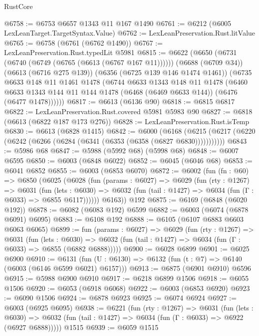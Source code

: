 \begin{lexlean}{RustCore}
\begin{coremodule}
@6758 := @6753 @6657 @1343 @11 @167 @1490
@6761 := @6212 (@6005 LexLeanTarget.TargetSyntax.Value)
@6762 := LexLeanPreservation.Rust.litValue
@6765 := @6758 (@6761 (@6762 @1490))
@6767 := LexLeanPreservation.Rust.typedLit @5981
@6815 := @6622
    (@6650
      (@6731 (@6740 (@6749 (@6765 (@6613 (@6767 @167 @11))))))
      (@6688 (@6709 @34))
      (@6613 (@6716 @275 @139))
      (@6356 (@6725 @139 @146 @1474 @1461))
      (@6735
        @6633
        @148
        @11
        @1461
        @1478
        (@6744
          @6633
          @1343
          @148
          @11
          @1478
          (@6460
            @6633
            @1343
            @144
            @11
            @144
            @1478
            (@6468 (@6469 @6633 @144))
            (@6476 (@6477 @1478))))))
@6817 := @6613 (@6136 @90)
@6818 := @6815 @6817
@6822 := LexLeanPreservation.Rust.covered @5981 @5983 @90
@6827 := @6818 (@6613 (@6822 @187 @173 @276))
@6828 := LexLeanPreservation.Rust.isTemp
@6830 := @6613 (@6828 @1415)
@6842 := @6000
    (@6168 (@6215 (@6217 (@6220 (@6242 (@6266 (@6284 (@6341 (@6353 (@6358 (@6827 @6830)))))))))))
@6843 := @5986 @68
@6847 := @5988 (@5992 @68) (@5998 @68)
@6848 := @6007 @6595
@6850 := @6003 (@6848 @6022)
@6852 := @6045 (@6046 @68)
@6853 := @6041 @6852
@6855 := @6003 (@6853 @6070)
@6872 := @6002
    (fun (fn : @60) =>
    @6850
      (@6025
        (@6028
          (fun (params : @6027) =>
          @6029
            (fun (rty : @1267) =>
            @6031
              (fun (lets : @6030) =>
              @6032 (fun (tail : @1427) => @6034 (fun (Γ : @6033) => @6855 @6117))))))
        @6163))
    @192
@6875 := @6169 (@6848 (@6020 @192))
@6878 := @6082 (@6083 @192) @6599
@6882 := @6003 (@6074 (@6878 @6091) @6095)
@6883 := @6108 @192
@6888 := @6105 (@6107 @6883 @6603 @6063 @6065)
@6899 := fun (params : @6027) =>
  @6029
    (fun (rty : @1267) =>
    @6031
      (fun (lets : @6030) =>
      @6032 (fun (tail : @1427) => @6034 (fun (Γ : @6033) => @6855 (@6882 @6888)))))
@6900 := @6028 @6899
@6901 := @6025 @6900
@6910 := @6131 (fun (U : @6130) => @6132 (fun (t : @7) => @6140 (@6003 (@6146 @6599 @6021) @6157)))
@6913 := @6875 (@6901 @6910) @6596
@6915 := @5988 @6900 @6910
@6917 := @6218 @6899 @1506
@6918 := @6055 @1506
@6920 := @6053 (@6918 @6068)
@6922 := @6003 (@6853 @6920)
@6923 := @6090 @1506
@6924 := @6878 @6923
@6925 := @6074 @6924
@6927 := @6003 (@6925 @6095)
@6938 := @6221
    (fun (rty : @1267) =>
    @6031
      (fun (lets : @6030) =>
      @6032 (fun (tail : @1427) => @6034 (fun (Γ : @6033) => @6922 (@6927 @6888)))))
    @1515
@6939 := @6059 @1515

\end{coremodule}
\end{lexlean}
